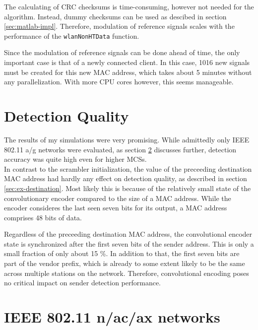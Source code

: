 The calculating of CRC checksums is time-consuming, however not needed for the algorithm. Instead, dummy checksums can be used as descibed in section \ref{sec:matlab-impl}. Therefore, modulation of reference signals scales with the performance of the \texttt{wlanNonHTData} function.

Since the modulation of reference signals can be done ahead of time, the only important case is that of a newly connected client. In this case, 1016 new signals must be created for this new MAC address, which takes about 5 minutes without any parallelization. With more CPU cores however, this seems manageable.



\section{Detection Quality}\label{sec:detection-quality}

The results of my simulations were very promising. While admittedly only IEEE 802.11 a/g networks were evaluated, as section \ref{sec:mimo} discusses further, detection accuracy was quite high even for higher \glspl{MCS}.\\

In contrast to the scrambler initialization, the value of the preceeding destination MAC address had hardly any effect on detection quality, as described in section \ref{sec:ex-destination}. Most likely this is because of the relatively small state of the convolutionary encoder compared to the size of a MAC address. While the encoder consideres the last seen seven bits for its output, a MAC address comprises 48 bits of data.

Regardless of the preceeding destination MAC address, the convolutional encoder state is synchronized after the first seven bits of the sender address. This is only a small fraction of only about 15 \%. In addition to that, the first seven bits are part of the vendor prefix, which is already to some extent likely to be the same across multiple stations on the network. Therefore, convolutional encoding poses no critical impact on sender detection performance.



\section{IEEE 802.11 n/ac/ax networks}\label{sec:mimo}

